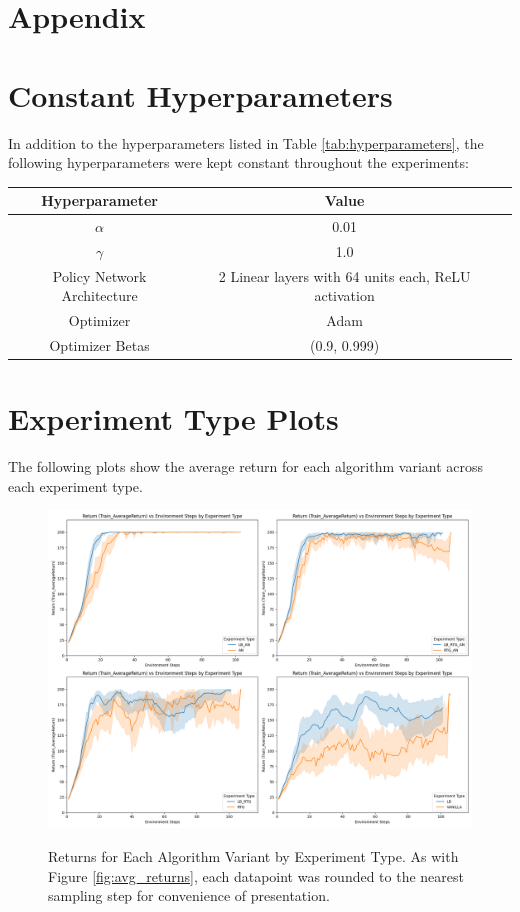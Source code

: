 \documentclass{article} %
\begin{document}



\appendix
\section*{Appendix}
\section{Constant Hyperparameters}
In addition to the hyperparameters listed in Table \ref{tab:hyperparameters}, 
the following hyperparameters were kept constant throughout the experiments:

\begin{tabular}{ccc}
    \toprule
    Hyperparameter & Value \\
    \midrule
    $\alpha$ & 0.01 \\
    $\gamma$ & 1.0 \\
    Policy Network Architecture & 2 Linear layers with 64 units each, ReLU activation \\
    Optimizer & Adam \\
    Optimizer Betas & (0.9, 0.999) \\
    \bottomrule
\end{tabular}

\section{Experiment Type Plots} \label{sec:experiment_type_plots}
The following plots show the average return for each algorithm variant across each experiment type.
\begin{figure}[h]
    \centering
    \captionsetup{justification=centering}
    \includegraphics[width = \linewidth, height = 0.4\textheight]{plots/return-vs-env-steps-all-expt-types.png}
    \label{fig:returns_by_experiment_type}
    \caption{Returns for Each Algorithm Variant by Experiment Type. As with Figure \ref{fig:avg_returns},
    each datapoint was rounded to the nearest sampling step for convenience of presentation.}
\end{figure}
\end{document}
